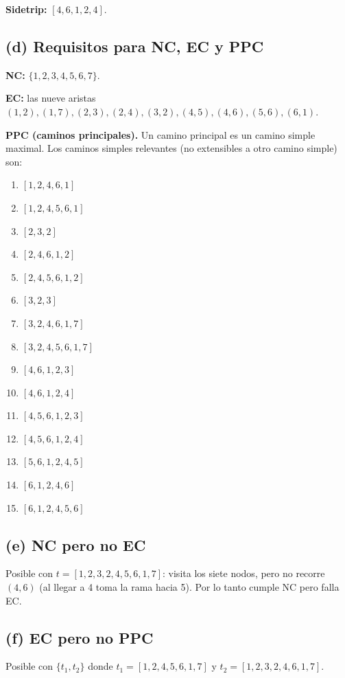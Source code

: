 \documentclass[12pt,a4paper]{article}
\begin{document}
\textbf{Sidetrip:} $[4, 6, 1, 2, 4]$.

\subsection{(d) Requisitos para NC, EC y PPC}

\textbf{NC:} $\{1, 2, 3, 4, 5, 6, 7\}$.

\textbf{EC:} las nueve aristas $(1,2), (1,7), (2,3), (2,4), (3,2), (4,5), (4,6), (5,6), (6,1)$.

\textbf{PPC (caminos principales).} Un camino principal es un camino simple maximal. Los caminos
simples relevantes (no extensibles a otro camino simple) son:

\begin{enumerate}
  \item $[1, 2, 4, 6, 1]$
  \item $[1, 2, 4, 5, 6, 1]$
  \item $[2, 3, 2]$
  \item $[2, 4, 6, 1, 2]$
  \item $[2, 4, 5, 6, 1, 2]$
  \item $[3, 2, 3]$
  \item $[3, 2, 4, 6, 1, 7]$
  \item $[3, 2, 4, 5, 6, 1, 7]$
  \item $[4, 6, 1, 2, 3]$
  \item $[4, 6, 1, 2, 4]$
  \item $[4, 5, 6, 1, 2, 3]$
  \item $[4, 5, 6, 1, 2, 4]$
  \item $[5, 6, 1, 2, 4, 5]$
  \item $[6, 1, 2, 4, 6]$
  \item $[6, 1, 2, 4, 5, 6]$
\end{enumerate}

\subsection{(e) NC pero no EC}

Posible con $t = [1, 2, 3, 2, 4, 5, 6, 1, 7]$: visita los siete nodos, pero no recorre $(4, 6)$
(al llegar a 4 toma la rama hacia 5). Por lo tanto cumple NC pero falla EC.

\subsection{(f) EC pero no PPC}

Posible con $\{t_1, t_2\}$ donde $t_1 = [1, 2, 4, 5, 6, 1, 7]$ y $t_2 = [1, 2, 3, 2, 4, 6, 1, 7]$.
\end{document}
